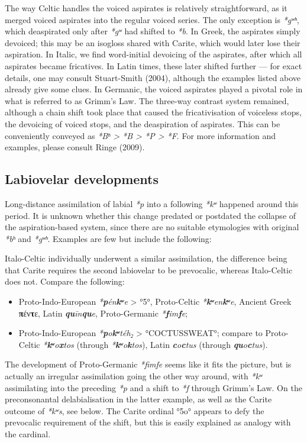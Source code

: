 \documentclass[svgnames,x11names,b5paper]{book}
\begin{document}
The way Celtic handles the voiced aspirates is relatively straightforward, as it merged voiced aspirates into the regular voiced series. The only exception is \textit{*gʷʰ}, which deaspirated only after \textit{*gʷ} had shifted to \textit{*b}. In Greek, the aspirates simply devoiced; this may be an isogloss shared with Carite, which would later lose their aspiration. In Italic, we find word-initial devoicing of the aspirates, after which all aspirates became fricatives. In Latin times, these later shifted further — for exact details, one may consult Stuart-Smith (2004), although the examples listed above already give some clues. In Germanic, the voiced aspirates played a pivotal role in what is referred to as Grimm's Law. The three-way contrast system remained, although a chain shift took place that caused the fricativisation of voiceless stops, the devoicing of voiced stops, and the deaspiration of aspirates. This can be conveniently conveyed as \textit{*Bʰ > *B > *P > *F}. For more information and examples, please consult Ringe (2009).

            \subsection{Labiovelar developments}
        
        Long-distance assimilation of labial \textit{*p} into a following \textit{*kʷ} happened around this period. It is unknown whether this change predated or postdated the collapse of the aspiration-based system, since there are no suitable etymologies with original \textit{*bʰ} and \textit{*gʷʰ}. Examples are few but include the following:

            Italo-Celtic individually underwent a similar assimilation, the difference being that Carite requires the second labiovelar to be prevocalic, whereas Italo-Celtic does not. Compare the following:
\begin{itemize}
\item  Proto-Indo-European \textit{*\textbf{p}én\textbf{kʷ}e} > °5°, Proto-Celtic \textit{*\textbf{kʷ}en\textbf{kʷ}e}, Ancient Greek \textbf{π}έν\textbf{τ}ε, Latin \textit{\textbf{qu}īn\textbf{qu}e}, Proto-Germanic \textit{*\textbf{f}im\textbf{f}e};\\
\item  Proto-Indo-European \textit{*\textbf{p}o\textbf{kʷ}téh₂} > °COCTUSSWEAT°; compare to Proto-Celtic \textit{*\textbf{kʷ}o\textbf{x}tos} (through \textit{*\textbf{kʷ}o\textbf{k}tos}), Latin \textit{\textbf{c}o\textbf{c}tus} (through \textit{\textbf{qu}o\textbf{c}tus}).\\
\end{itemize}
The development of Proto-Germanic \textit{*fimfe} seems like it fits the picture, but is actually an irregular assimilation going the other way around, with \textit{*kʷ} assimilating into the preceding \textit{*p} and a shift to \textit{*f} through Grimm's Law. On the preconsonantal delabialisation in the latter example, as well as the Carite outcome of \textit{*kʷs}, see below. The Carite ordinal °5o° appears to defy the prevocalic requirement of the shift, but this is easily explained as analogy with the cardinal.
\end{document}

